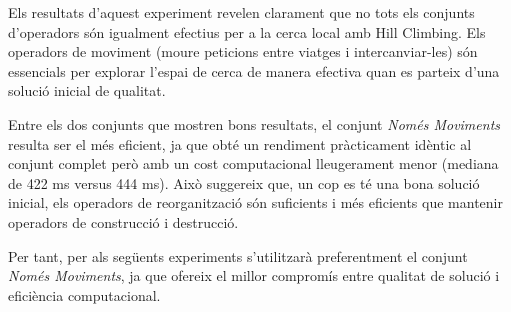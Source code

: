 Els resultats d'aquest experiment revelen clarament que no tots els conjunts d'operadors són igualment efectius per a la cerca local amb Hill Climbing. Els operadors de moviment (moure peticions entre viatges i intercanviar-les) són essencials per explorar l'espai de cerca de manera efectiva quan es parteix d'una solució inicial de qualitat.

Entre els dos conjunts que mostren bons resultats, el conjunt \textit{Només Moviments} resulta ser el més eficient, ja que obté un rendiment pràcticament idèntic al conjunt complet però amb un cost computacional lleugerament menor (mediana de 422 ms versus 444 ms). Això suggereix que, un cop es té una bona solució inicial, els operadors de reorganització són suficients i més eficients que mantenir operadors de construcció i destrucció.

Per tant, per als següents experiments s'utilitzarà preferentment el conjunt \textit{Només Moviments}, ja que ofereix el millor compromís entre qualitat de solució i eficiència computacional.